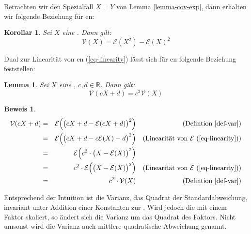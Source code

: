 \documentclass[a4paper]{article}
\newtheorem{korollar}[satz]{Korollar}
\newtheorem{lemma}[satz]{Lemma}
\theoremstyle{nonumberplain}
\newtheorem{beweis}{Beweis}
\begin{document}
Betrachten wir den Spezialfall $X = Y$  von Lemma \ref{lemma-cov-exp}, dann erhalten wir folgende Beziehung für \var{}en:

\begin{korollar}\label{kor-var-exp}
	Sei $X$ eine \rvar{}. Dann gilt:
	\begin{equation}
		\mathcal{V}(X) = \mathcal{E}(X^{2}) - \mathcal{E}\left(X\right)^{2}
	\end{equation}
\end{korollar}
Dual zur Linearität von \expect{}en (\ref{eq-linearity}) lässt sich für \var{}en folgende Beziehung feststellen:
\begin{lemma}\label{lemma-var-qlinear}
	Sei $X$ eine \rvar{}, $c,d \in \mathbb{R}$. Dann gilt:
	\begin{equation}
		\mathcal{V}(cX + d) = c^2\mathcal{V}(X)
	\end{equation}
\end{lemma}
\begin{beweis}
\begin{align*}
\mathcal{V}(cX + d) & = & \mathcal{E}\Big(\big(cX + d - \mathcal{E}(cX + d)\big)^2\Big) && \text{(Defintion \ref{def-var})} \\
& = & \mathcal{E}\Big(\big(cX + d - c\mathcal{E}(X) - d\big)^2\Big) && \text{(Linearität von $\mathcal{E}$ (\ref{eq-linearity}))}\\
& = & \mathcal{E}\Big(c^2 \cdot \big(X - \mathcal{E}(X) \big)^2\Big)\\
& = & c^2 \cdot \mathcal{E}\Big( \big(X - \mathcal{E}(X) \big)^2\Big) && \text{(Linearität von $\mathcal{E}$ (\ref{eq-linearity}))}\\
& = & c^2 \cdot \mathcal{V}(X) && \text{(Defintion \ref{def-var})}
\end{align*}
\end{beweis}
Entsprechend der Intuition ist die Varianz, das Quadrat der Standardabweichung, invariant unter Addition einer Konstanten zur \rvar{}. Wird jedoch die \rvar{} mit einem Faktor skaliert, so ändert sich die Varianz um das Quadrat des Faktors. Nicht umsonst wird die Varianz auch mittlere quadratische Abweichung genannt.
\end{document}
